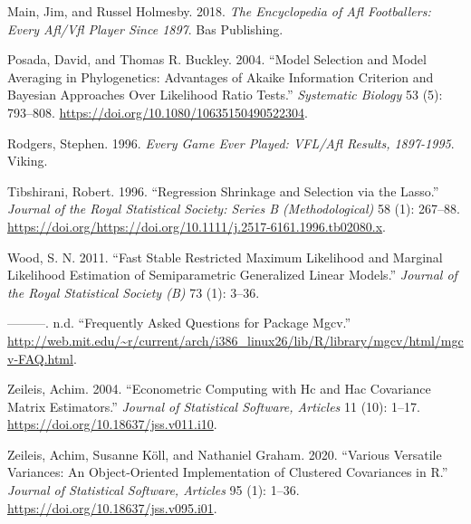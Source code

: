 \documentclass{article}
\begin{document}
\leavevmode\hypertarget{ref-everyone}{}%
Main, Jim, and Russel Holmesby. 2018. \emph{The Encyclopedia of Afl
Footballers: Every Afl/Vfl Player Since 1897}. Bas Publishing.

\leavevmode\hypertarget{ref-10.1080ux2f10635150490522304}{}%
Posada, David, and Thomas R. Buckley. 2004. ``Model Selection and Model
Averaging in Phylogenetics: Advantages of Akaike Information Criterion
and Bayesian Approaches Over Likelihood Ratio Tests.'' \emph{Systematic
Biology} 53 (5): 793--808.
\url{https://doi.org/10.1080/10635150490522304}.

\leavevmode\hypertarget{ref-everygame}{}%
Rodgers, Stephen. 1996. \emph{Every Game Ever Played: VFL/Afl Results,
1897-1995}. Viking.

\leavevmode\hypertarget{ref-https:ux2fux2fdoi.orgux2f10.1111ux2fj.2517-6161.1996.tb02080.x}{}%
Tibshirani, Robert. 1996. ``Regression Shrinkage and Selection via the
Lasso.'' \emph{Journal of the Royal Statistical Society: Series B
(Methodological)} 58 (1): 267--88.
\url{https://doi.org/https://doi.org/10.1111/j.2517-6161.1996.tb02080.x}.

\leavevmode\hypertarget{ref-mgcv}{}%
Wood, S. N. 2011. ``Fast Stable Restricted Maximum Likelihood and
Marginal Likelihood Estimation of Semiparametric Generalized Linear
Models.'' \emph{Journal of the Royal Statistical Society (B)} 73 (1):
3--36.

\leavevmode\hypertarget{ref-wood}{}%
---------. n.d. ``Frequently Asked Questions for Package Mgcv.''
\url{http://web.mit.edu/~r/current/arch/i386_linux26/lib/R/library/mgcv/html/mgcv-FAQ.html}.

\leavevmode\hypertarget{ref-JSSv011i10}{}%
Zeileis, Achim. 2004. ``Econometric Computing with Hc and Hac Covariance
Matrix Estimators.'' \emph{Journal of Statistical Software, Articles} 11
(10): 1--17. \url{https://doi.org/10.18637/jss.v011.i10}.

\leavevmode\hypertarget{ref-JSSv095i01}{}%
Zeileis, Achim, Susanne Köll, and Nathaniel Graham. 2020. ``Various
Versatile Variances: An Object-Oriented Implementation of Clustered
Covariances in R.'' \emph{Journal of Statistical Software, Articles} 95
(1): 1--36. \url{https://doi.org/10.18637/jss.v095.i01}.



\end{document}
